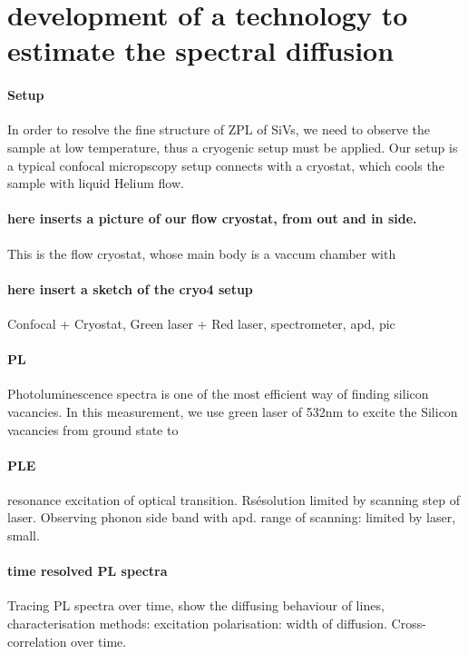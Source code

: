 \section[development of a technology to estimate the spectral diffusion]{development of a technology to estimate the spectral diffusion}

\paragraph{Setup} 

In order to resolve the fine structure of ZPL of SiVs, we need to observe the sample at low temperature, thus a cryogenic setup must be applied.
Our setup is a typical confocal micropscopy setup connects with a cryostat, which cools the sample with liquid Helium flow.

\paragraph{here inserts a picture of our flow cryostat, from out and in side.}
This is the flow cryostat, whose main body is a vaccum chamber with

\paragraph{here insert a sketch of the cryo4 setup}
Confocal + Cryostat, Green laser + Red laser, spectrometer, apd, pic


\paragraph{PL} Photoluminescence spectra is one of the most efficient way of finding silicon vacancies. In this measurement, we use green laser of 532nm to excite the Silicon vacancies from ground state to 

\paragraph{PLE} resonance excitation of optical transition. Rsésolution limited by scanning step of laser. Observing phonon side band with apd. range of scanning: limited by laser, small.

\paragraph{time resolved PL spectra} Tracing PL spectra over time, show the diffusing behaviour of lines, characterisation methods: excitation polarisation: width of diffusion. Cross- correlation over time.
